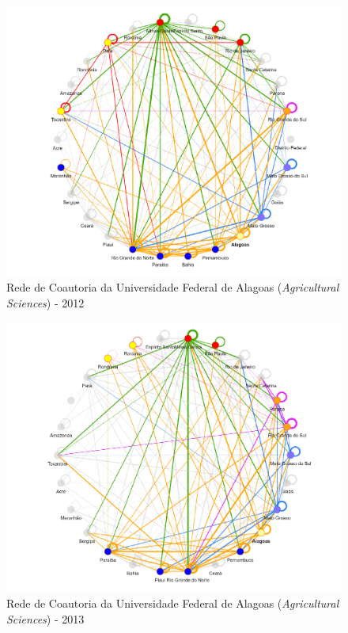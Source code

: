 \begin{figure}[H]
	\centering
	\includegraphics[width=\linewidth]{Imagens/rede-agr-AL-2012.pdf}
	\caption{Rede de Coautoria da Universidade Federal de Alagoas (\textit{Agricultural Sciences}) - 2012}
	\label{Rede de Coautoria - UF AGRI AL 2012}
\end{figure}

\begin{figure}[H]
	\centering
	\includegraphics[width=\linewidth]{Imagens/rede-agr-AL-2013.pdf}
	\caption{Rede de Coautoria da Universidade Federal de Alagoas (\textit{Agricultural Sciences}) - 2013}
	\label{Rede de Coautoria - UF AGRI AL 2013}
\end{figure}

